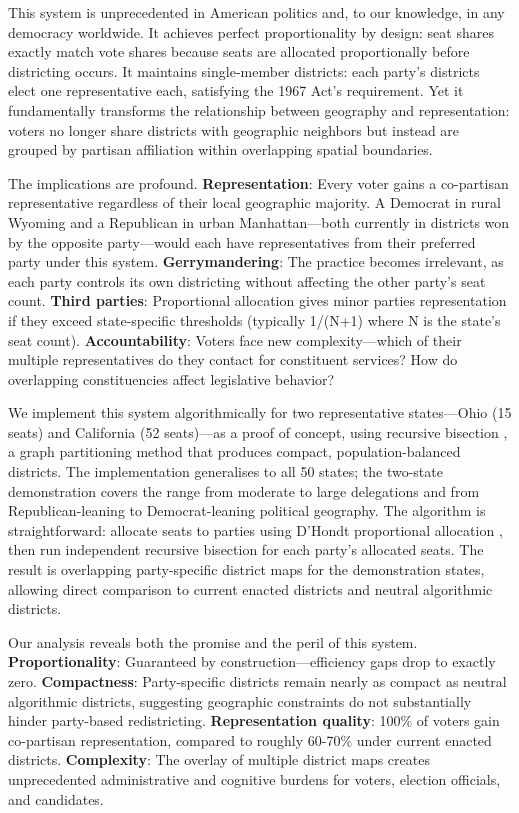 This system is unprecedented in American politics and, to our knowledge, in any democracy worldwide. It achieves perfect proportionality by design: seat shares exactly match vote shares because seats are allocated proportionally before districting occurs. It maintains single-member districts: each party's districts elect one representative each, satisfying the 1967 Act's requirement. Yet it fundamentally transforms the relationship between geography and representation: voters no longer share districts with geographic neighbors but instead are grouped by partisan affiliation within overlapping spatial boundaries.

The implications are profound. \textbf{Representation}: Every voter gains a co-partisan representative regardless of their local geographic majority. A Democrat in rural Wyoming and a Republican in urban Manhattan—both currently in districts won by the opposite party—would each have representatives from their preferred party under this system. \textbf{Gerrymandering}: The practice becomes irrelevant, as each party controls its own districting without affecting the other party's seat count. \textbf{Third parties}: Proportional allocation gives minor parties representation if they exceed state-specific thresholds (typically 1/(N+1) where N is the state's seat count). \textbf{Accountability}: Voters face new complexity—which of their multiple representatives do they contact for constituent services? How do overlapping constituencies affect legislative behavior?

We implement this system algorithmically for two representative states---Ohio (15 seats) and California (52 seats)---as a proof of concept, using recursive bisection \citep{author2024recursive}, a graph partitioning method that produces compact, population-balanced districts. The implementation generalises to all 50 states; the two-state demonstration covers the range from moderate to large delegations and from Republican-leaning to Democrat-leaning political geography. The algorithm is straightforward: allocate seats to parties using D'Hondt proportional allocation \citep{gallagher2011election}, then run independent recursive bisection for each party's allocated seats. The result is overlapping party-specific district maps for the demonstration states, allowing direct comparison to current enacted districts and neutral algorithmic districts.

Our analysis reveals both the promise and the peril of this system. \textbf{Proportionality}: Guaranteed by construction—efficiency gaps drop to exactly zero. \textbf{Compactness}: Party-specific districts remain nearly as compact as neutral algorithmic districts, suggesting geographic constraints do not substantially hinder party-based redistricting. \textbf{Representation quality}: 100\% of voters gain co-partisan representation, compared to roughly 60-70\% under current enacted districts. \textbf{Complexity}: The overlay of multiple district maps creates unprecedented administrative and cognitive burdens for voters, election officials, and candidates.

